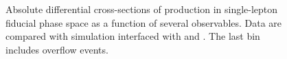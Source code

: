 \begin{figure}[ht]
  \quad\quad
  \quad\quad
  \caption{Absolute differential cross-sections of \tty production in single-lepton fiducial phase space as a function of several observables. Data are compared with \madgraph simulation interfaced with \pythia and \herwig. The last bin includes overflow events.}
  \label{fig:pt_unfolded_ljet_dist_realdata}
\end{figure}
\FloatBarrier



